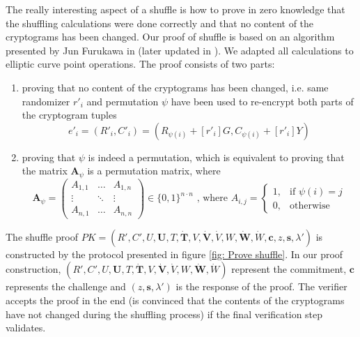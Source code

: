 The really interesting aspect of a shuffle is how to prove in zero knowledge that the shuffling calculations were done correctly and that no content of the cryptograms has been changed. Our proof of shuffle is based on an algorithm presented by Jun Furukawa in \cite{Furukawa01} (later updated in \cite{Furukawa03, Furukawa04}). We adapted all calculations to elliptic curve point operations. The proof consists of two parts:
\begin{enumerate}
    \item proving that no content of the cryptograms has been changed, i.e. same randomizer $r'_i$ and permutation $\psi$ have been used to re-encrypt both parts of the cryptogram tuples
    \[ e'_i = (R'_i, C'_i) = (R_{\psi(i)} + [r'_i]G, C_{\psi(i)} + [r'_i]Y) \]
    \item proving that $\psi$ is indeed a permutation, which is equivalent to proving that the matrix \( \boldsymbol{A}_\psi \) is a permutation matrix, where
\[
\boldsymbol{A}_\psi = \begin{pmatrix}
    A_{1, 1} & \dots & A_{1, n} \\
    \vdots & \ddots & \vdots \\
    A_{n, 1} & \dots & A_{n, n}
\end{pmatrix} \in \{0, 1\}^{n \cdot n}
\text{ , where }
A_{i,j}= 
\begin{cases}
    1, & \text{if } \psi(i) = j \\
    0, & \text{otherwise}
\end{cases}
\]
\end{enumerate}


The shuffle proof \( PK = ( R', C', U, \boldsymbol{U}, T, \boldsymbol{\dot{T}}, V, \boldsymbol{\dot{V}}, \dot{V}, W, \boldsymbol{\dot{W}}, \dot{W}, \boldsymbol{c}, z, \boldsymbol{s}, \lambda') \) is constructed by the protocol presented in figure \ref{fig: Prove shuffle}. In our proof construction, \( (R', C', U, \boldsymbol{U}, T, \boldsymbol{\dot{T}}, V, \boldsymbol{\dot{V}}, \dot{V}, W, \boldsymbol{\dot{W}}, \dot{W}) \) represent the commitment, $\boldsymbol{c}$ represents the challenge and \( (z, \boldsymbol{s}, \lambda') \) is the response of the proof. The verifier accepts the proof in the end (is convinced that the contents of the cryptograms have not changed during the shuffling process) if the final verification step validates.


